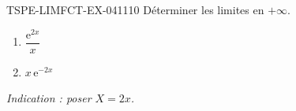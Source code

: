 \begin{exercice}{TSPE-LIMFCT-EX-041}{1}{10}
Déterminer les limites en $+\infty$.
\begin{enumerate}
  \item $\dfrac{\mathrm{e}^{2x}}{x}$
  \item $x\,\mathrm{e}^{-2x}$
\end{enumerate}
\textit{Indication : poser $X = 2x$.}
\end{exercice}
